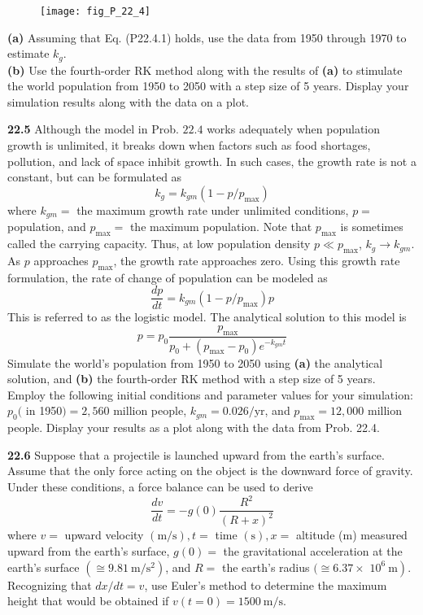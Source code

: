 \begin{multicols}{2}
    \begin{figure}[H]
        \centering
        \texttt{[image: fig\_P\_22\_4]}
    \end{figure}
    
    \noindent\textbf{(a)} Assuming that Eq. (P22.4.1) holds, use the data from
    1950 through 1970 to estimate $k_g$.\\
    \textbf{(b)} Use the fourth-order RK method along with the results of \textbf{(a)} to stimulate the world population from 1950 to 2050 with a step size of 5 years. Display your simulation results along with the data on a plot.\vspace{2mm}

    \noindent\textbf{22.5} Although the model in Prob. $22.4$ works adequately when population growth is unlimited, it breaks down when factors such as food shortages, pollution, and lack of space inhibit growth. In such cases, the growth rate is not a constant, but can be formulated as
    $$
    k_{g}=k_{g m}\left(1-p / p_{\max }\right)
    $$
    where $k_{g m}=$ the maximum growth rate under unlimited conditions, $p=$ population, and $p_{\max }=$ the maximum population. Note that $p_{\max }$ is sometimes called the carrying capacity. Thus, at low population density $p \ll p_{\max }$, $k_{g} \rightarrow k_{g m}$. As $p$ approaches $p_{\max }$, the growth rate approaches zero. Using this growth rate formulation, the rate of change of population can be modeled as
    $$
    \frac{d p}{d t}=k_{g m}\left(1-p / p_{\max }\right) p
    $$ This is referred to as the logistic model. The analytical solution to this model is
    $$
    p=p_{0} \frac{p_{\max }}{p_{0}+\left(p_{\max }-p_{0}\right) e^{-k_{g m} t}}
    $$
    Simulate the world's population from 1950 to 2050 using \textbf{(a)} the analytical solution, and \textbf{(b)} the fourth-order RK method with a step size of 5 years. Employ the following initial conditions and parameter values for your simulation: $p_{0}($ in 1950$)=2,560$ million people, $k_{g m}=0.026 / \mathrm{yr}$, and $p_{\max }=12,000$ million people. Display your results as a plot along with the data from Prob. 22.4.\vspace{2mm}

    \noindent\textbf{22.6} Suppose that a projectile is launched upward from the earth's surface. Assume that the only force acting on the object is the downward force of gravity. Under these conditions, a force balance can be used to derive
    $$
    \frac{d v}{d t}=-g(0) \frac{R^{2}}{(R+x)^{2}}
    $$
    where $v=$ upward velocity $(\mathrm{m} / \mathrm{s}), t=$ time $(\mathrm{s}), x=$ altitude (m) measured upward from the earth's surface, $g(0)=$ the gravitational acceleration at the earth's surface $\left(\cong 9.81 \mathrm{~m} / \mathrm{s}^{2}\right)$, and $R=$ the earth's radius $(\cong 6.37 \times$ $\left.10^{6} \mathrm{~m}\right)$. Recognizing that $d x / d t=v$, use Euler's method to determine the maximum height that would be obtained if $v(t=0)=1500 \mathrm{~m} / \mathrm{s}$.\vspace{2mm}


\end{multicols}
